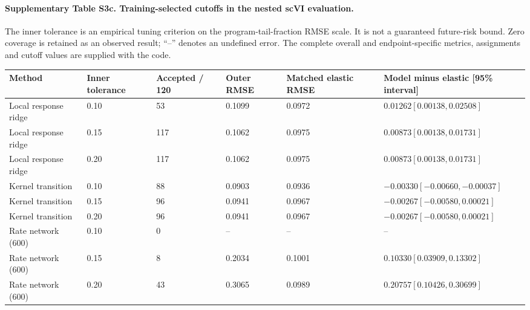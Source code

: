 \documentclass[a4paper,fleqn]{cas-sc}
\makeatletter
\DeclareRobustCommand{\rev}[1]{{\color{red}\def\@citecolor{black}\def\@linkcolor{red}\def\@urlcolor{red}#1}}
\makeatother
\begin{document}
\clearpage
\paragraph{Supplementary Table S3c. Training-selected cutoffs in the nested scVI evaluation.}
\rev{The inner tolerance is an empirical tuning criterion on the program-tail-fraction RMSE scale.} It is not a guaranteed future-risk bound. Zero coverage is retained as an observed result; ``--'' denotes an undefined error. The complete overall and endpoint-specific metrics, assignments and cutoff values are supplied with the code.
\small
\begin{longtable}{p{}p{}p{}p{}p{}p{}}
\toprule
\rev{Method} & \rev{Inner tolerance} & \rev{Accepted / 120} & \rev{Outer RMSE} & \rev{Matched elastic RMSE} & \rev{Model minus elastic [95\% interval]}\\
\midrule
\endhead
\rev{Local response ridge} & \rev{0.10} & \rev{53} & \rev{0.1099} & \rev{0.0972} & \rev{$0.01262$\newline$[0.00138,0.02508]$}\\
\rev{Local response ridge} & \rev{0.15} & \rev{117} & \rev{0.1062} & \rev{0.0975} & \rev{$0.00873$\newline$[0.00138,0.01731]$}\\
\rev{Local response ridge} & \rev{0.20} & \rev{117} & \rev{0.1062} & \rev{0.0975} & \rev{$0.00873$\newline$[0.00138,0.01731]$}\\
\rev{Kernel transition} & \rev{0.10} & \rev{88} & \rev{0.0903} & \rev{0.0936} & \rev{$-0.00330$\newline$[-0.00660,-0.00037]$}\\
\rev{Kernel transition} & \rev{0.15} & \rev{96} & \rev{0.0941} & \rev{0.0967} & \rev{$-0.00267$\newline$[-0.00580,0.00021]$}\\
\rev{Kernel transition} & \rev{0.20} & \rev{96} & \rev{0.0941} & \rev{0.0967} & \rev{$-0.00267$\newline$[-0.00580,0.00021]$}\\
\rev{Rate network (600)} & \rev{0.10} & \rev{0} & \rev{--} & \rev{--} & \rev{--}\\
\rev{Rate network (600)} & \rev{0.15} & \rev{8} & \rev{0.2034} & \rev{0.1001} & \rev{$0.10330$\newline$[0.03909,0.13302]$}\\
\rev{Rate network (600)} & \rev{0.20} & \rev{43} & \rev{0.3065} & \rev{0.0989} & \rev{$0.20757$\newline$[0.10426,0.30699]$}\\

\end{longtable}
\end{document}
